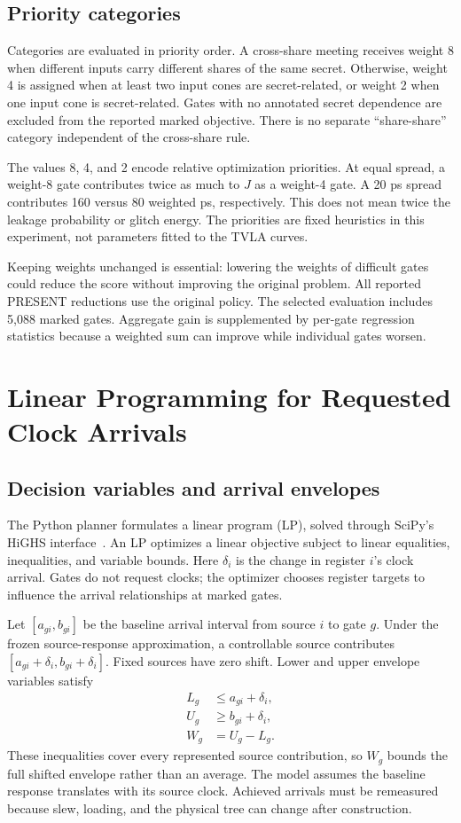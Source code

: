 \documentclass[conference]{IEEEtran}
\begin{document}
\subsection{Priority categories}
Categories are evaluated in priority order. A cross-share meeting receives weight 8 when different inputs carry different shares of the same secret. Otherwise, weight 4 is assigned when at least two input cones are secret-related, or weight 2 when one input cone is secret-related. Gates with no annotated secret dependence are excluded from the reported marked objective. There is no separate ``share-share'' category independent of the cross-share rule.

The values 8, 4, and 2 encode relative optimization priorities. At equal spread, a weight-8 gate contributes twice as much to $J$ as a weight-4 gate. A 20 ps spread contributes 160 versus 80 weighted ps, respectively. This does not mean twice the leakage probability or glitch energy. The priorities are fixed heuristics in this experiment, not parameters fitted to the TVLA curves.

Keeping weights unchanged is essential: lowering the weights of difficult gates could reduce the score without improving the original problem. All reported PRESENT reductions use the original policy. The selected evaluation includes 5,088 marked gates. Aggregate gain is supplemented by per-gate regression statistics because a weighted sum can improve while individual gates worsen.

\section{Linear Programming for Requested Clock Arrivals}
\subsection{Decision variables and arrival envelopes}
The Python planner formulates a linear program (LP), solved through SciPy's HiGHS interface~\cite{scipy}. An LP optimizes a linear objective subject to linear equalities, inequalities, and variable bounds. Here $\delta_i$ is the change in register $i$'s clock arrival. Gates do not request clocks; the optimizer chooses register targets to influence the arrival relationships at marked gates.

Let $[a_{gi},b_{gi}]$ be the baseline arrival interval from source $i$ to gate $g$. Under the frozen source-response approximation, a controllable source contributes $[a_{gi}+\delta_i,b_{gi}+\delta_i]$. Fixed sources have zero shift. Lower and upper envelope variables satisfy
\begin{align}
L_g&\le a_{gi}+\delta_i,\\
U_g&\ge b_{gi}+\delta_i,\\
W_g&=U_g-L_g.
\end{align}
These inequalities cover every represented source contribution, so $W_g$ bounds the full shifted envelope rather than an average. The model assumes the baseline response translates with its source clock. Achieved arrivals must be remeasured because slew, loading, and the physical tree can change after construction.
\end{document}
